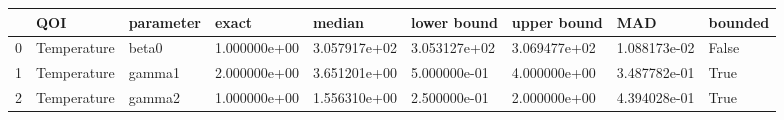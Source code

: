 \begin{tabular}{lllllllll}
\toprule
{} &          QOI & parameter &        exact &       median &  lower bound &  upper bound &          MAD & bounded \\
\midrule
0 &  Temperature &     beta0 & 1.000000e+00 & 3.057917e+02 & 3.053127e+02 & 3.069477e+02 & 1.088173e-02 &   False \\
1 &  Temperature &    gamma1 & 2.000000e+00 & 3.651201e+00 & 5.000000e-01 & 4.000000e+00 & 3.487782e-01 &    True \\
2 &  Temperature &    gamma2 & 1.000000e+00 & 1.556310e+00 & 2.500000e-01 & 2.000000e+00 & 4.394028e-01 &    True \\
\bottomrule
\end{tabular}
